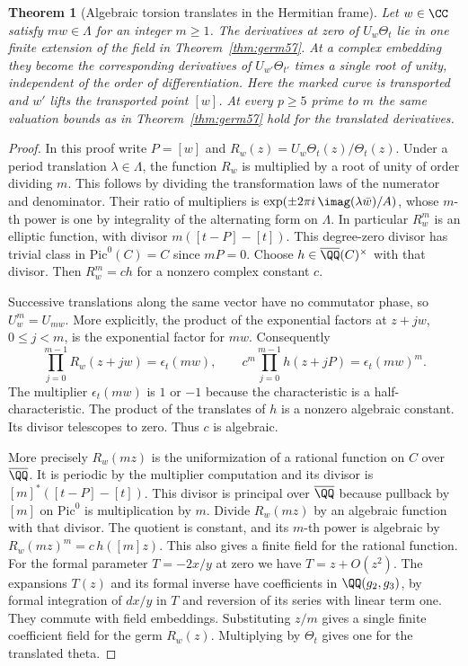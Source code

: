 \documentclass[a4paper,11pt]{article}
\newtheorem{theorem}[proposition]{Theorem}
\theoremstyle{definition}
\theoremstyle{remark}
\numberwithin{equation}{section}
\begin{document}
\begin{theorem}[Algebraic torsion translates in the Hermitian frame]\label{thm:trans57}
Let \(w\in\CC\) satisfy \(m w\in\Lambda\) for an integer \(m\ge1\).
The derivatives at zero of \(U_w\Theta_t\) lie in one finite
extension of the field in Theorem~\ref{thm:germ57}. At a complex
embedding they become the corresponding derivatives of
\(U_{w'}\Theta_{t'}\) times a single root of unity, independent
of the order of differentiation. Here the marked curve is
transported and \(w'\) lifts the transported point \([w]\).
At every \(p\ge5\) prime to \(m\) the same valuation bounds as in
Theorem~\ref{thm:germ57} hold for the translated derivatives.
\end{theorem}
\begin{proof}
In this proof write \(P=[w]\) and \(R_w(z)=U_w\Theta_t(z)/\Theta_t(z)\).
Under a period translation \(\lambda\in\Lambda\), the function
\(R_w\) is multiplied by a root of unity of order dividing \(m\).
This follows by dividing the transformation laws of the numerator
and denominator. Their ratio of multipliers is
\(\exp(\pm2\pi i\,\imag(\lambda\bar w)/A)\), whose \(m\)-th power
is one by integrality of the alternating form on \(\Lambda\).
In particular \(R_w^m\) is an elliptic function, with divisor
\(m([t-P]-[t])\). This degree-zero divisor has trivial class
in \(\mathrm{Pic}^0(C)=C\) since \(mP=0\). Choose
\(h\in\overline{\QQ}(C)^\times\) with that divisor. Then
\(R_w^m=ch\) for a nonzero complex constant \(c\).

Successive translations along the same vector have no commutator
phase, so \(U_w^m=U_{mw}\). More explicitly, the product of the
exponential factors at \(z+jw\), \(0\le j<m\), is the exponential
factor for \(mw\). Consequently
\[
 \prod_{j=0}^{m-1}R_w(z+jw)=\epsilon_t(mw),\qquad
 c^m\prod_{j=0}^{m-1}h(z+jP)=\epsilon_t(mw)^m .
\]
The multiplier \(\epsilon_t(mw)\) is \(1\) or \(-1\) because the
characteristic is a half-characteristic. The product of the
translates of \(h\) is a nonzero algebraic constant. Its divisor
telescopes to zero. Thus \(c\) is algebraic.

More precisely \(R_w(mz)\) is the uniformization of a rational
function on \(C\) over \(\overline{\QQ}\). It is periodic by the
multiplier computation and its divisor is
\([m]^*([t-P]-[t])\). This divisor is principal over
\(\overline{\QQ}\) because pullback by \([m]\) on \(\mathrm{Pic}^0\)
is multiplication by \(m\). Divide \(R_w(mz)\) by an algebraic
function with that divisor. The quotient is constant, and its
\(m\)-th power is algebraic by \(R_w(mz)^m=c\,h([m]z)\).
This also gives a finite field for the rational function.
For the formal parameter \(T=-2x/y\) at zero we have \(T=z+O(z^2)\).
The expansions \(T(z)\) and its formal inverse have coefficients
in \(\QQ(g_2,g_3)\), by formal integration of \(dx/y\) in \(T\)
and reversion of its series with linear term one. They commute
with field embeddings. Substituting \(z/m\) gives a single finite
coefficient field for the germ \(R_w(z)\). Multiplying by
\(\Theta_t\) gives one for the translated theta.


\end{proof}
\end{document}
